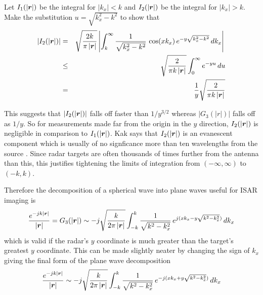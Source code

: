 Let $I_1(\left|\bm{r}\right|)$ be the integral for $\left|k_x\right|<k$
and $I_2(\left|\bm{r}\right|)$ be the integral for $\left|k_x\right|>k$.
Make the substitution $u=\sqrt{k_x^2-k^2}$ to show that
\begin{eqnarray}
\left|I_2(\left|\bm{r}\right|)\right|
&=&\sqrt{\frac{2k}{\pi\left|\bm{r}\right|}} \left| \int_k^{\infty} 
\frac{1}{\sqrt{k_x^2-k^2}}
\,\cos(xk_x)\,e^{-y\sqrt{k_x^2-k^2}}\,dk_x\right|{\nonumber}\\
&\leq&\sqrt{\frac{2}{\pi k\left|\bm{r}\right|}}\int_0^{\infty} 
e^{-yu}\,du{\nonumber}\\
&=&\frac{1}{y}\sqrt{\frac{2}{\pi k\left|\bm{r}\right|}}
\end{eqnarray}
 
This suggests that $\left|I_2(\left|\bm{r}\right|)\right|$ falls off
faster than $1/y^{3/2}$ whereas $\left|G_3(\left|r\right|)\right|$ falls off 
as $1/y$.  So for measurements made far from the origin in the $y$ direction,
$I_2(\left|\bm{r}\right|)$ is negligible in comparison to 
$I_1(\left|\bm{r}\right|)$.  Kak says that $I_2(\left|\bm{r}\right|)$ is
an evanescent component which is usually of no signficance more than ten 
wavelengths from the source \cite[p. 367]{Hay85b}.  Since radar targets are 
often thousands of times further from the antenna than this, this justifies
tightening the limits of integration from $(-\infty,\infty)$ to $(-k,k)$.

Therefore the decomposition of a spherical wave into plane waves 
useful for ISAR imaging is
\begin{equation}
\frac{\displaystyle e^{-jk\left|\bm{r}\right|}}{\left|\bm{r}\right|}=
G_3(\left|\bm{r}\right|)\sim -j\sqrt{\frac{k}{2\pi\left|\bm{r}\right|}}
\int_{-k}^k \frac{1}{\sqrt{k^2-k_x^2}}\,e^{j(xk_x-y\sqrt{k^2-k_x^2})}\,dk_x
\end{equation}
which is valid if the radar's $y$ coordinate is much greater than the
target's greatest $y$ coordinate.  This can be made slightly neater by
changing the sign of $k_x$ giving the final form of the plane wave
decomposition
\begin{equation}
\frac{\displaystyle e^{-jk\left|\bm{r}\right|}}{\left|\bm{r}\right|}
\sim -j\sqrt{\frac{k}{2\pi\left|\bm{r}\right|}}
\int_{-k}^k \frac{1}{\sqrt{k^2-k_x^2}}\,e^{-j(xk_x+y\sqrt{k^2-k_x^2})}\,dk_x
\end{equation}

